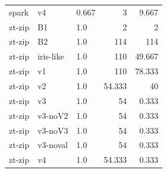 \begin{table}[t]
{\begin{tabular}{lllrr}
spark & v4 & 0.667 & 3 & 9.667 \\
zt-zip & B1 & 1.0 & 2 & 2 \\
zt-zip & B2 & 1.0 & 114 & 114 \\
zt-zip & iris-like & 1.0 & 110 & 49.667 \\
zt-zip & v1 & 1.0 & 110 & 78.333 \\
zt-zip & v2 & 1.0 & 54.333 & 40 \\
zt-zip & v3 & 1.0 & 54 & 0.333 \\
zt-zip & v3-noV2 & 1.0 & 54 & 0.333 \\
zt-zip & v3-noV3 & 1.0 & 54 & 0.333 \\
zt-zip & v3-noval & 1.0 & 54 & 0.333 \\
zt-zip & v4 & 1.0 & 54.333 & 0.333 \\
\bottomrule
\end{tabular}}
\end{table}

\begin{table}[t]
\centering\small
\caption{Resource budget}
\label{tab:budget}
\end{table}
